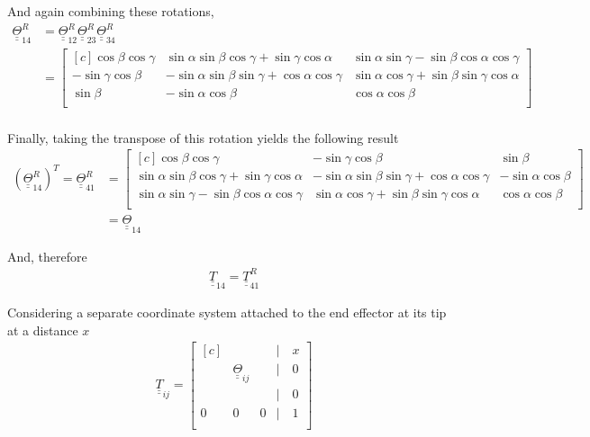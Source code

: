 \documentclass[onecolumn,10pt]{jhwhw}
\def\du#1{\underline{\underline{#1}}}
\begin{document}
And again combining these rotations,
\begin{align*}
\du{\Theta}_{14}^{R} &= \du{\Theta}_{12}^{R} \du{\Theta}_{23}^{R} \du{\Theta}_{34}^{R} \\
&=
\begin{bmatrix*}[c]
 \cos \beta \cos \gamma &  \sin \alpha \sin \beta \cos \gamma + \sin \gamma \cos \alpha & \sin \alpha \sin \gamma - \sin \beta \cos \alpha \cos \gamma \\
-\sin \gamma \cos \beta & -\sin \alpha \sin \beta \sin \gamma + \cos \alpha \cos \gamma & \sin \alpha \cos \gamma + \sin \beta \sin \gamma \cos \alpha \\
             \sin \beta &                                       -\sin \alpha \cos \beta &                                       \cos \alpha \cos \beta \\
\end{bmatrix*} \\
\end{align*}

Finally, taking the transpose of this rotation yields the following result
\begin{align*}
\left ( {\du{\Theta}_{14}^{R}} \right)^T = \du{\Theta}_{41}^{R} &=
\begin{bmatrix*}[c]
                                      \cos \beta \cos \gamma &                                       -\sin \gamma \cos \beta &              \sin \beta \\
\sin \alpha \sin \beta \cos \gamma + \sin \gamma \cos \alpha & -\sin \alpha \sin \beta \sin \gamma + \cos \alpha \cos \gamma & -\sin \alpha \cos \beta \\
\sin \alpha \sin \gamma - \sin \beta \cos \alpha \cos \gamma &  \sin \alpha \cos \gamma + \sin \beta \sin \gamma \cos \alpha &  \cos \alpha \cos \beta \\
\end{bmatrix*} \\
&=\du{\Theta}_{14}
\end{align*}

And, therefore
\begin{align*}
\du{T}_{14} = \du{T}_{41}^R
\end{align*}

\clearpage

Considering a separate coordinate system attached to the end effector at its tip at a distance $x$
\begin{align*}
\du{T}_{ij} =
\begin{bmatrix*}[c]
& & & | \hspace{1em} x \\
& \du{\Theta}_{ij} & & | \hspace{1em} 0 \\
& & & | \hspace{1em} 0 \\
0 & 0 & 0 & | \hspace{1em} 1 \\
\end{bmatrix*}
\end{align*}
\end{document}
